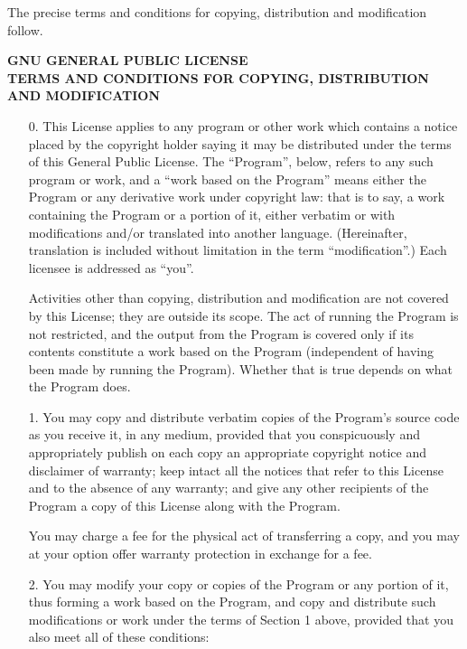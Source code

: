 The precise terms and conditions for copying, distribution and
modification follow.

\begin{center}
{\bf GNU GENERAL PUBLIC LICENSE } \\
{\bf TERMS AND CONDITIONS FOR COPYING, DISTRIBUTION AND MODIFICATION}
\end{center}

\setcounter{enumi}{0}
\begin{enumerate}
\item[0.] This License applies to any program or other work which contains
a notice placed by the copyright holder saying it may be distributed
under the terms of this General Public License.  The ``Program'', below,
refers to any such program or work, and a ``work based on the Program''
means either the Program or any derivative work under copyright law:
that is to say, a work containing the Program or a portion of it,
either verbatim or with modifications and/or translated into another
language.  (Hereinafter, translation is included without limitation in
the term ``modification''.)  Each licensee is addressed as ``you''.

Activities other than copying, distribution and modification are not
covered by this License; they are outside its scope.  The act of
running the Program is not restricted, and the output from the Program
is covered only if its contents constitute a work based on the
Program (independent of having been made by running the Program).
Whether that is true depends on what the Program does.
\item[1.] You may copy and distribute verbatim copies of the Program's
source code as you receive it, in any medium, provided that you
conspicuously and appropriately publish on each copy an appropriate
copyright notice and disclaimer of warranty; keep intact all the
notices that refer to this License and to the absence of any warranty;
and give any other recipients of the Program a copy of this License
along with the Program.

You may charge a fee for the physical act of transferring a copy, and
you may at your option offer warranty protection in exchange for a fee.
\item[2.] You may modify your copy or copies of the Program or any portion
of it, thus forming a work based on the Program, and copy and
distribute such modifications or work under the terms of Section 1
above, provided that you also meet all of these conditions:


\end{enumerate}

